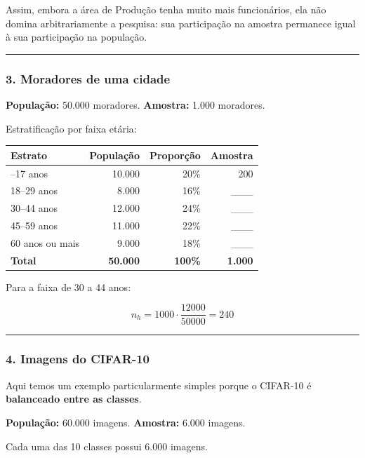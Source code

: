\documentclass[
]{book}
\begin{document}
Assim, embora a área de Produção tenha muito mais funcionários, ela não domina arbitrariamente a pesquisa: sua participação na amostra permanece igual à sua participação na população.

\begin{center}\rule{0.5\linewidth}{0.5pt}\end{center}

\subsubsection{3. Moradores de uma cidade}\label{moradores-de-uma-cidade}

\textbf{População:} 50.000 moradores.
\textbf{Amostra:} 1.000 moradores.

Estratificação por faixa etária:

\begin{longtable}[]{@{}lrrr@{}}
\toprule\noalign{}
Estrato & População & Proporção & Amostra \\
\midrule\noalign{}
\endhead
\bottomrule\noalign{}
\endlastfoot
0--17 anos & 10.000 & 20\% & 200 \\
18--29 anos & 8.000 & 16\% & \_\_\_ \\
30--44 anos & 12.000 & 24\% & \_\_\_ \\
45--59 anos & 11.000 & 22\% & \_\_\_ \\
60 anos ou mais & 9.000 & 18\% & \_\_\_ \\
\textbf{Total} & \textbf{50.000} & \textbf{100\%} & \textbf{1.000} \\
\end{longtable}

Para a faixa de 30 a 44 anos:

\[
n_h = 1000\cdot\frac{12000}{50000}= 240
\]

\begin{center}\rule{0.5\linewidth}{0.5pt}\end{center}

\subsubsection{4. Imagens do CIFAR-10}\label{imagens-do-cifar-10}

Aqui temos um exemplo particularmente simples porque o CIFAR-10 é \textbf{balanceado entre as classes}.

\textbf{População:} 60.000 imagens.
\textbf{Amostra:} 6.000 imagens.

Cada uma das 10 classes possui 6.000 imagens.
\end{document}
